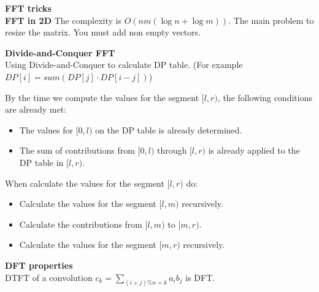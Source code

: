 \textbf{\huge{FFT tricks}}\\
\textbf{FFT in 2D}
The complexity is $O(nm(\log n + \log m))$.
The main problem to resize the matrix. You must add non empty vectors.

\textbf{Divide-and-Conquer FFT}\\
Using Divide-and-Conquer to calculate DP table. (For example $DP[i] = sum(DP[j] \cdot DP[i - j])$) 

By the time we compute the values for the segment $[l,r)$, the following conditions are already met:
\begin{itemize}
\item The values for $[0,l)$ on the DP table is already determined.
\item The sum of contributions from $[0,l)$ through $[l,r)$ is already applied to the DP table in $[l,r)$.
\end{itemize}

When calculate the values for the segment $[l, r)$ do:
\begin{itemize}
\item Calculate the values for the segment $[l,m)$ recursively.
\item Calculate the contributions from $[l,m)$ to $[m,r)$.
\item Calculate the values for the segment $[m,r)$ recursively.
\end{itemize}

\textbf{DFT properties}\\
DTFT of a convolution $c_k = \sum_{(i + j)\%n=k}a_ib_j$ is DFT.
